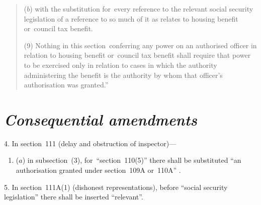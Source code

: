 \documentclass[12pt,a4paper]{article}
\begin{document}
\begin{quotation}
\begin{enumerate}
($b$) with the substitution for~every reference to the relevant social security legislation of a reference to so much of it as relates to housing benefit or~council tax benefit.
\end{enumerate}

(9) Nothing in this section~conferring any power on an authorised officer in relation to housing benefit or~council tax benefit shall require that power to be exercised only in relation to cases in which the authority administering the benefit is the authority by whom that officer’s authorisation was granted.”
\end{quotation}


\section*{\itshape Consequential amendments}

4. In section~111 (delay and obstruction of inspector)—
\begin{enumerate}\item[]
($a$) in subsection~(3), for~“section~110(5)” there shall be substituted “an authorisation granted under section~109A or~110A”%
%
%
%
.
\end{enumerate}


\medskip

5. In section~111A(1)  (dishonest representations), before “social security legislation” there shall be inserted “relevant”.
\end{document}
